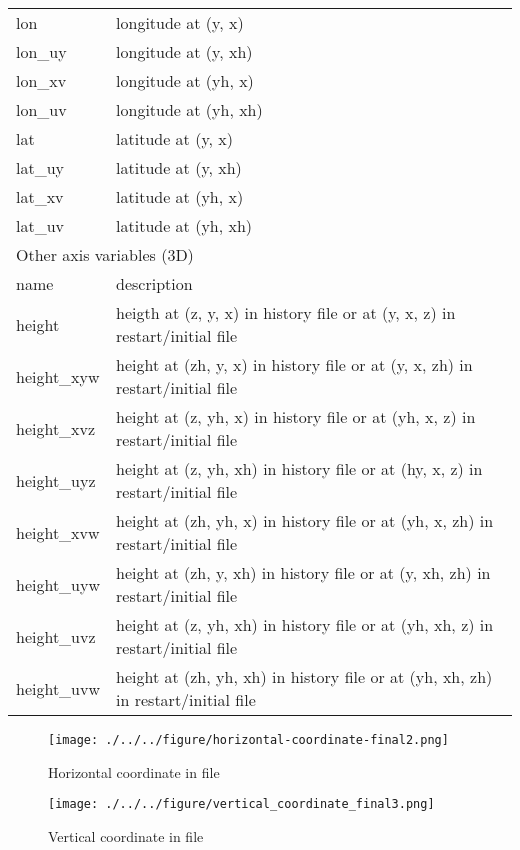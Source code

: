 \begin{longtable}{l|l}
lon     & longitude at (y, x) \\
lon\_uy & longitude at (y, xh) \\
lon\_xv & longitude at (yh, x) \\
lon\_uv & longitude at (yh, xh) \\
lat     & latitude  at (y, x) \\
lat\_uy & latitude  at (y, xh) \\
lat\_xv & latitude  at (yh, x) \\
lat\_uv & latitude  at (yh, xh) \\
\hline
\multicolumn{2}{l}{Other axis variables (3D)}\\ \hline
name & description \\ \hline \hline
height      & heigth at (z, y, x)    in history file or at (y, x, z)    in restart/initial file\\
height\_xyw & height at (zh, y, x)   in history file or at (y, x, zh)   in restart/initial file\\
height\_xvz & height at (z, yh, x)   in history file or at (yh, x, z)   in restart/initial file\\
height\_uyz & height at (z, yh, xh)  in history file or at (hy, x, z)   in restart/initial file\\
height\_xvw & height at (zh, yh, x)  in history file or at (yh, x, zh)  in restart/initial file\\
height\_uyw & height at (zh, y, xh)  in history file or at (y, xh, zh)  in restart/initial file\\
height\_uvz & height at (z, yh, xh)  in history file or at (yh, xh, z)  in restart/initial file\\
height\_uvw & height at (zh, yh, xh) in history file or at (yh, xh, zh) in restart/initial file\\
\end{longtable}



\begin{figure}[tbh]
\begin{center}
  \texttt{[image: ./../../figure/horizontal-coordinate-final2.png]}\\
  \caption{Horizontal coordinate in {\scalenetcdf} file}
  \label{fig:netcdfhorizontalcoordinate}
\end{center}
\end{figure}
\begin{figure}[tbh]
\begin{center}
  \texttt{[image: ./../../figure/vertical\_coordinate\_final3.png]}\\
  \caption{Vertical coordinate in {\scalenetcdf} file}
  \label{fig:netcdfverticalcoordinate}
\end{center}
\end{figure}



